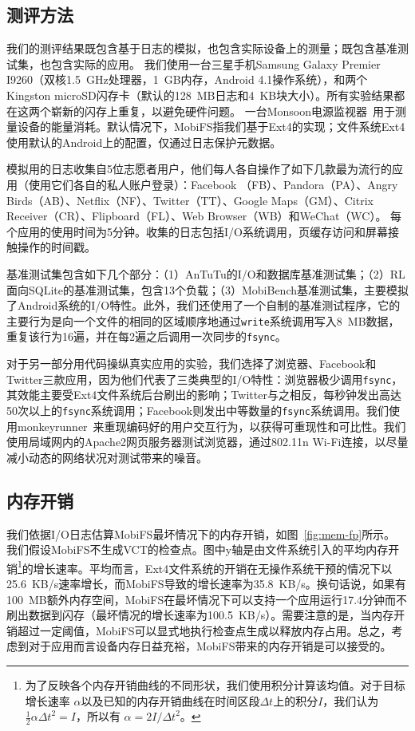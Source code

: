 \subsection{测评方法} \label{vct:method}

我们的测评结果既包含基于日志的模拟，也包含实际设备上的测量；既包含基准测试集，也包含实际的应用。
我们使用一台三星手机Samsung
Galaxy Premier I9260（双核1.5~GHz处理器，1~GB内存，Android 4.1操作系统），和两个Kingston microSD闪存卡（默认的128~MB日志和4~KB块大小）。所有实验结果都在这两个崭新的闪存上重复，以避免硬件问题。
一台Monsoon电源监视器~\cite{Monsoon:PM}用于测量设备的能量消耗。默认情况下，MobiFS指我们基于Ext4的实现；文件系统Ext4使用默认的Android上的配置，仅通过日志保护元数据。

模拟用的日志收集自5位志愿者用户，他们每人各自操作了如下几款最为流行的应用（使用它们各自的私人账户登录）：Facebook
（FB）、Pandora（PA）、Angry Birds（AB）、Netflix（NF）、Twitter（TT）、Google Maps（GM）、Citrix Receiver（CR）、Flipboard（FL）、Web Browser（WB）和WeChat（WC）。 每个应用的使用时间为5分钟。收集的日志包括I/O系统调用，页缓存访问和屏幕接触操作的时间戳。

基准测试集包含如下几个部分：（1）AnTuTu的I/O和数据库基准测试集；（2）RL面向SQLite的基准测试集，包含13个负载；（3）MobiBench基准测试集，主要模拟了Android系统的I/O特性。此外，我们还使用了一个自制的基准测试程序，它的主要行为是向一个文件的相同的区域顺序地通过\texttt{write}系统调用写入8~MB数据，重复该行为16遍，并在每2遍之后调用一次同步的\texttt{fsync}。

对于另一部分用代码操纵真实应用的实验，我们选择了浏览器、Facebook和Twitter三款应用，因为他们代表了三类典型的I/O特性：浏览器极少调用\texttt{fsync}，其效能主要受Ext4文件系统后台刷出的影响；Twitter与之相反，每秒钟发出高达50次以上的\texttt{fsync}系统调用；Facebook则发出中等数量的\texttt{fsync}系统调用。我们使用monkeyrunner~\cite{Monkeyrunner}来重现编码好的用户交互行为，以获得可重现性和可比性。我们使用局域网内的Apache2网页服务器测试浏览器，通过802.11n Wi-Fi连接，以尽量减小动态的网络状况对测试带来的噪音。

\subsection{内存开销} \label{vct:mem-fp}

我们依据I/O日志估算MobiFS最坏情况下的内存开销，如图~\ref{fig:mem-fp}所示。
我们假设MobiFS不生成VCT的检查点。图中y轴是由文件系统引入的平均内存开销\footnote{为了反映各个内存开销曲线的不同形状，我们使用积分计算该均值。对于目标增长速率
$\alpha$以及已知的内存开销曲线在时间区段${\Delta t}$上的积分$I$，我们认为$\frac{1}{2}\alpha{\Delta t}^2 = I$，所以有
$\alpha=2I/{\Delta t}^2$。}的增长速率。平均而言，Ext4文件系统的开销在无操作系统干预的情况下以25.6~KB/s速率增长，而MobiFS导致的增长速率为35.8~KB/s。换句话说，如果有100~MB额外内存空间，MobiFS在最坏情况下可以支持一个应用运行17.4分钟而不刷出数据到闪存（最坏情况的增长速率为100.5~KB/s）。需要注意的是，当内存开销超过一定阈值，MobiFS可以显式地执行检查点生成以释放内存占用。总之，考虑到对于应用而言设备内存日益充裕，MobiFS带来的内存开销是可以接受的。

